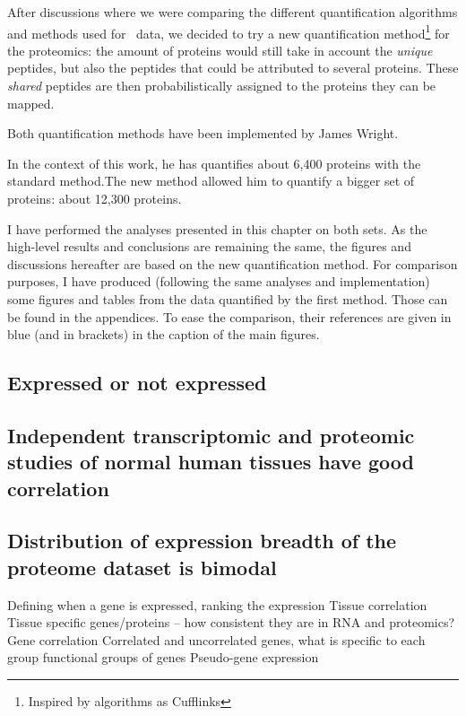After discussions where we were comparing the different quantification algorithms
and methods used for \Rnaseq\ data, we decided to try a new quantification
method\footnote{Inspired by algorithms as Cufflinks} for the proteomics:
the amount of proteins would still take in account the \emph{unique} peptides,
but also the peptides that could be attributed to several proteins.
These \emph{shared} peptides are then probabilistically assigned to the proteins
they can be mapped.

Both quantification methods have been implemented by James Wright.

In the context of this work, he has quantifies about 6,400 proteins with
the standard method.The new method allowed him to quantify a bigger set of
proteins: about 12,300 proteins.


I have performed the analyses presented in this chapter on both sets. As
the high-level results and conclusions are remaining the same,
the figures and discussions hereafter are based on
the new quantification method. For comparison purposes,
I have produced (following the same analyses and implementation)
some figures and tables from the data quantified by the first method.
Those can be found in the appendices. To ease the comparison, their references
are given in blue (and in brackets) in the caption of the main figures.

\subsection{Expressed or not expressed}


\subsection{Independent transcriptomic and proteomic studies of normal
human tissues have good correlation}


\subsection{Distribution of expression breadth of the proteome dataset is bimodal}


Defining when a gene is expressed, ranking the expression
Tissue correlation
Tissue specific genes/proteins – how consistent they are in RNA and proteomics?
Gene correlation
Correlated and uncorrelated genes, what is specific to each group
functional groups of genes
Pseudo-gene expression



